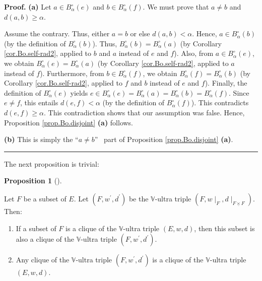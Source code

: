 \documentclass[numbers=enddot,12pt,final,onecolumn,notitlepage]{scrartcl}%
\theoremstyle{definition}
\newtheorem{prop}[theo]{Proposition}
\newenvironment{proposition}[1][]
{\begin{prop}[#1]\begin{leftbar}}
{\end{leftbar}\end{prop}}
\newenvironment{proof}[1][Proof]{\noindent\textbf{#1.} }{\ \rule{0.5em}{0.5em}}
\newcommand{\timesu}{\mathbin{\underline{\times}}}
\renewcommand{\geq}{\geqslant}
\theoremstyle{plainsl}
\begin{document}
\begin{proof}
\textbf{(a)} Let $a\in B_{\alpha}^{\circ}\left(  e\right)  $ and $b\in
B_{\alpha}^{\circ}\left(  f\right)  $. We must prove that $a\neq b$ and
$d\left(  a,b\right)  \geq\alpha$.

Assume the contrary. Thus, either $a=b$ or else $d\left(  a,b\right)  <\alpha
$. Hence, $a\in B_{\alpha}^{\circ}\left(  b\right)  $ (by the definition of
$B_{\alpha}^{\circ}\left(  b\right)  $). Thus, $B_{\alpha}^{\circ}\left(
b\right)  =B_{\alpha}^{\circ}\left(  a\right)  $ (by Corollary
\ref{cor.Bo.self-rad2}, applied to $b$ and $a$ instead of $e$ and $f$). Also,
from $a\in B_{\alpha}^{\circ}\left(  e\right)  $, we obtain $B_{\alpha}%
^{\circ}\left(  e\right)  =B_{\alpha}^{\circ}\left(  a\right)  $ (by Corollary
\ref{cor.Bo.self-rad2}, applied to $a$ instead of $f$). Furthermore, from
$b\in B_{\alpha}^{\circ}\left(  f\right)  $, we obtain $B_{\alpha}^{\circ
}\left(  f\right)  =B_{\alpha}^{\circ}\left(  b\right)  $ (by Corollary
\ref{cor.Bo.self-rad2}, applied to $f$ and $b$ instead of $e$ and $f$).
Finally, the definition of $B_{\alpha}^{\circ}\left(  e\right)  $ yields $e\in
B_{\alpha}^{\circ}\left(  e\right)  =B_{\alpha}^{\circ}\left(  a\right)
=B_{\alpha}^{\circ}\left(  b\right)  =B_{\alpha}^{\circ}\left(  f\right)  $.
Since $e\neq f$, this entails $d\left(  e,f\right)  <\alpha$ (by the
definition of $B_{\alpha}^{\circ}\left(  f\right)  $). This contradicts
$d\left(  e,f\right)  \geq\alpha$. This contradiction shows that our
assumption was false. Hence, Proposition \ref{prop.Bo.disjoint} \textbf{(a)}
follows. \medskip

\textbf{(b)} This is simply the \textquotedblleft$a\neq b$\textquotedblright%
\ part of Proposition \ref{prop.Bo.disjoint} \textbf{(a)}.
\end{proof}

The next proposition is trivial:

\begin{proposition}
\label{prop.cliques.sub}Let $F$ be a subset of $E$. Let $\left(  F,w^{\prime
},d^{\prime}\right)  $ be the $\mathbb{V}$-ultra triple $\left(  F,w\mid
_{F},d\mid_{F\timesu F}\right)  $. Then:

\begin{enumerate}
\item[\textbf{(a)}] If a subset of $F$ is a clique of the $\mathbb{V}$-ultra
triple $\left(  E,w,d\right)  $, then this subset is also a clique of the
$\mathbb{V}$-ultra triple $\left(  F,w^{\prime},d^{\prime}\right)  $.

\item[\textbf{(b)}] Any clique of the $\mathbb{V}$-ultra triple $\left(
F,w^{\prime},d^{\prime}\right)  $ is a clique of the $\mathbb{V}$-ultra triple
$\left(  E,w,d\right)  $.
\end{enumerate}
\end{proposition}
\end{document}
